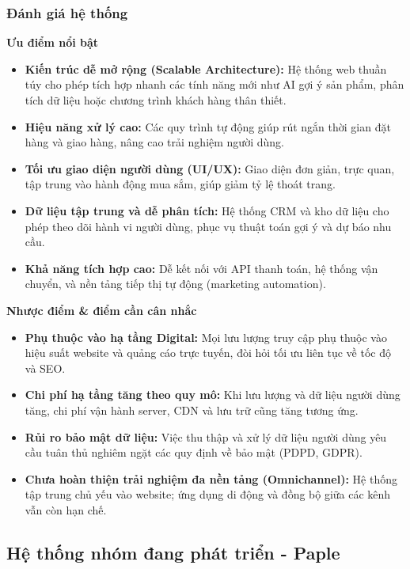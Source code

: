 \subsubsection{Đánh giá hệ thống}

\textbf{Ưu điểm nổi bật}

\begin{itemize}
  \item \textbf{Kiến trúc dễ mở rộng (Scalable Architecture):} Hệ thống web thuần túy cho phép tích hợp nhanh các tính năng mới như AI gợi ý sản phẩm, phân tích dữ liệu hoặc chương trình khách hàng thân thiết.
  \item \textbf{Hiệu năng xử lý cao:} Các quy trình tự động giúp rút ngắn thời gian đặt hàng và giao hàng, nâng cao trải nghiệm người dùng.
  \item \textbf{Tối ưu giao diện người dùng (UI/UX):} Giao diện đơn giản, trực quan, tập trung vào hành động mua sắm, giúp giảm tỷ lệ thoát trang.
  \item \textbf{Dữ liệu tập trung và dễ phân tích:} Hệ thống CRM và kho dữ liệu cho phép theo dõi hành vi người dùng, phục vụ thuật toán gợi ý và dự báo nhu cầu.
  \item \textbf{Khả năng tích hợp cao:} Dễ kết nối với API thanh toán, hệ thống vận chuyển, và nền tảng tiếp thị tự động (marketing automation).
\end{itemize}

\textbf{Nhược điểm \& điểm cần cân nhắc}

\begin{itemize}
  \item \textbf{Phụ thuộc vào hạ tầng Digital:} Mọi lưu lượng truy cập phụ thuộc vào hiệu suất website và quảng cáo trực tuyến, đòi hỏi tối ưu liên tục về tốc độ và SEO.
  \item \textbf{Chi phí hạ tầng tăng theo quy mô:} Khi lưu lượng và dữ liệu người dùng tăng, chi phí vận hành server, CDN và lưu trữ cũng tăng tương ứng.
  \item \textbf{Rủi ro bảo mật dữ liệu:} Việc thu thập và xử lý dữ liệu người dùng yêu cầu tuân thủ nghiêm ngặt các quy định về bảo mật (PDPD, GDPR).
  \item \textbf{Chưa hoàn thiện trải nghiệm đa nền tảng (Omnichannel):} Hệ thống tập trung chủ yếu vào website; ứng dụng di động và đồng bộ giữa các kênh vẫn còn hạn chế.
\end{itemize}
\subsection{Hệ thống nhóm đang phát triển - Paple}

